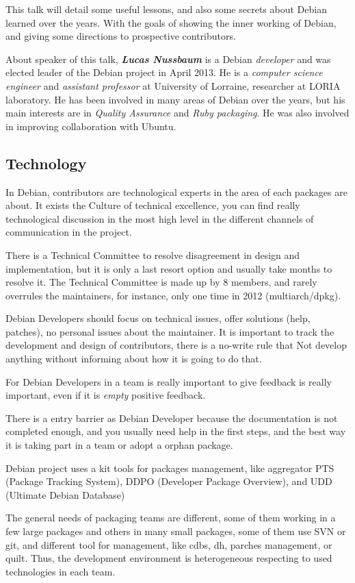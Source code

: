 \documentclass[11pt]{article}
\begin{document}
This talk will detail some useful lessons, and also some secrets about Debian learned over the years. With the goals of showing the inner working of Debian, and giving some directions to prospective contributors.

About speaker of this talk, \emph{\textbf{Lucas Nussbaum}} is a Debian \emph{developer} and was elected leader of the Debian project in April 2013. He is a \emph{computer science engineer} and \emph{assistant professor} at University of Lorraine, researcher at LORIA laboratory. He has been involved in many areas of Debian over the years, but his main interests are in \emph{Quality Assurance} and \emph{Ruby packaging}. He was also involved in improving collaboration with Ubuntu.

\subsection{Technology}
In Debian, contributors are technological experts in the area of each packages are about. It exists the Culture of technical excellence, you can find really technological discussion in the most high level in the different channels of communication in the project.

There is a Technical Committee to resolve disagreement in design and implementation, but it is only a last resort option and usually take months to resolve it. The Technical Committee is made up by 8 members, and rarely overrules the maintainers, for instance, only one time in 2012 (multiarch/dpkg).

Debian Developers should focus on technical issues, offer solutions (help, patches), no personal issues about the maintainer. It is important to track the development and design of contributors, there is a no-write rule that Not develop anything without informing about how it is going to do that.

For Debian Developers in a team is really important to give feedback is really important, even if it is \emph{empty} positive feedback.

There is a entry barrier as Debian Developer because the documentation is not completed enough, and you usually need help in the first steps, and the best way it is taking part in a team or adopt a orphan package.

Debian project uses a kit tools for packages management, like aggregator PTS (Package Tracking System), DDPO (Developer Package Overview), and UDD (Ultimate Debian Database) 

The general needs of packaging teams are different, some of them working in a few large packages and others in many small packages, some of them use SVN or git, and different tool for management, like  cdbs, dh, parches management, or quilt.  Thus, the development environment is heterogeneous respecting to used technologies in each team. 
\end{document}
